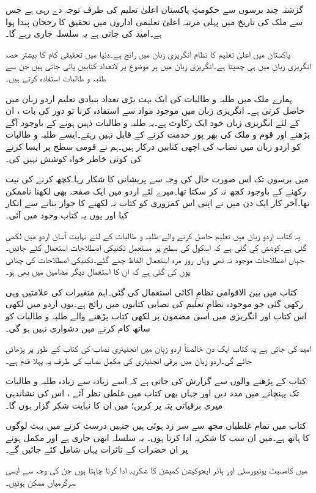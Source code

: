 گزشتہ چند برسوں سے حکومتِ پاکستان اعلیٰ تعلیم کی طرف توجہ دے رہی ہے جس سے ملک کی تاریخ میں پہلی مرتبہ اعلیٰ تعلیمی اداروں میں تحقیق کا رجحان پیدا ہوا ہے۔امید کی جاتی ہے یہ سلسلہ جاری رہے گا۔

پاکستان میں  اعلیٰ  تعلیم کا نظام انگریزی زبان میں رائج ہے۔دنیا میں تحقیقی کام کا بیشتر حصہ انگریزی زبان میں ہی چھپتا ہے۔انگریزی زبان میں ہر موضوع پر لاتعداد کتابیں پائی جاتی ہیں جن سے طلبہ و طالبات استفادہ  کرتے ہیں۔

ہمارے ملک میں طلبہ و طالبات کی ایک بہت بڑی تعداد بنیادی تعلیم اردو زبان میں حاصل کرتی ہے۔ انگریزی زبان میں موجود مواد سے استفادہ  کرنا تو دور کی بات ،  ان کے لئے انگریزی زبان خود ایک رکاوٹ  ہے۔یہ طلبہ و طالبات ذہین ہونے کے باوجود آگے بڑھنے اور قوم و ملک کی بھر پور خدمت کرنے کے قابل نہیں رہتے۔ایسے طلبہ و طالبات کو اردو زبان میں نصاب کی اچھی کتابیں درکار ہیں۔ہم نے قومی سطح پر ایسا کرنے کی کوئی خاطر خواہ کوشش نہیں کی۔ 

میں برسوں تک اس صورت حال کی وجہ سے پریشانی کا شکار رہا۔کچھ کرنے کی نیت رکھنے کے باوجود کچھ نہ کر سکتا تھا۔میرے لئے اردو میں ایک صفحہ بھی لکھنا ناممکن تھا۔آخر کار ایک دن میں نے اپنی اس کمزوری کو کتاب نہ لکھنے کا جواز بنانے سے انکار کیا اور یوں یہ کتاب وجود میں آئی۔

یہ کتاب اردو زبان میں تعلیم حاصل کرنے والے طلبہ و طالبات کے لئے نہایت آسان اردو میں لکھی گئی ہے۔کوشش کی گئی ہے کہ اسکول کی سطح پر  مستعمل تکنیکی اصطلاحات استعمال کئے جائیں۔جہاں اصطلاحات موجود نہ تھی  وہاں روز مرہ  استعمال الفاظ چنے گئے۔تکنیکی  اصطلاحات  کی چنائی  یوں کی گئی ہے کہ ان کا استعمال دیگر مضامین میں بھی ہو۔

کتاب میں بین الاقوامی نظامِ اکائی استعمال کی گئی۔اہم متغیرات کی علامتیں وہی رکھی گئی جو موجودہ نظامِ تعلیم کی نصابی کتابوں میں رائج ہے۔یوں اردو میں لکھی اس کتاب اور انگریزی میں اسی مضمون پر لکھی کتاب پڑھنے والے طلبہ و طالبات کو ساتھ کام کرنے میں دشواری نہیں ہو گی۔ 

امید کی جاتی ہے یہ کتاب ایک دن خالصتاً اردو زبان میں انجنیئری نصاب کی کتاب کے طور پر  پڑھائی جائے گی۔اردو زبان میں برقی انجنیئری کی مکمل نصاب کی طرف یہ پہلا قدم ہے۔ 

کتاب کے پڑھنے والوں سے گزارش کی جاتی ہے کہ اسے زیادہ سے زیادہ طلبہ و طالبات تک پہنچانے میں مدد دیں  اور جہاں بھی   کتاب میں غلطی نظر آئے ، اس کی نشاندہی میری  برقیاتی پتہ پر کریں؛ میں ان کا نہایت شکر گزار ہوں گا۔

 کتاب میں تمام غلطیاں مجھ سے سر زد ہوئی ہیں جنہیں درست کرنے میں بہت لوگوں کا ہاتھ ہے۔میں ان سب کا شکریہ ادا کرتا ہوں۔ یہ سلسلہ ابھی جاری ہے اور مکمل ہونے پر ان حضرات کے تاثرات یہاں شامل کئے جائیں گے۔  

میں کامسیٹ یونیورسٹی اور ہائر ایجوکیشن کمیشن کا شکریہ ادا کرنا چاہتا ہوں جن کی وجہ سے ایسی سرگرمیاں ممکن ہوئیں۔	
\vspace{5mm}

{}

